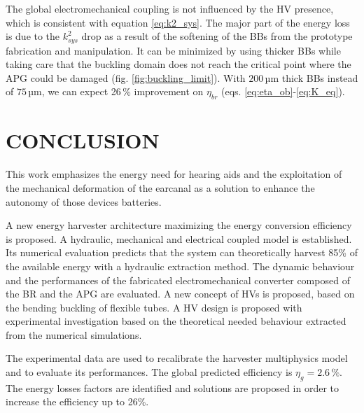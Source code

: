 \documentclass[3p,twocolumn,preprint]{elsarticle}
\begin{document}
The global electromechanical coupling is not influenced by the HV presence, which is consistent with equation \ref{eq:k2_sys}. The major part of the energy loss is due to the $k^2_{sys}$ drop as a result of the softening of the BBs from the prototype fabrication and manipulation. It can be minimized by using thicker BBs while taking care that the buckling domain does not reach the critical point where the APG could be damaged (fig. \ref{fig:buckling_limit}). With $200$\,µm thick BBs instead of $75$\,µm, we can expect 26\,\% improvement on $\eta_{br}$ (eqs. \ref{eq:eta_ob}-\ref{eq:K_eq}).
\section{CONCLUSION}
\label{sec:CONCLUSION}
This work emphasizes the energy need for hearing aids and the exploitation of the mechanical deformation of the earcanal as a solution to enhance the autonomy of those devices batteries.

A new energy harvester architecture maximizing the energy conversion efficiency is proposed. A hydraulic, mechanical and electrical coupled model is established. Its numerical evaluation predicts that the system can theoretically harvest 85\% of the available energy with a hydraulic extraction method. The dynamic behaviour and the performances of the fabricated electromechanical converter composed of the BR and the APG are evaluated. A new concept of HVs is proposed, based on the bending buckling of flexible tubes. A HV design is proposed with experimental investigation based on the theoretical needed behaviour extracted from the numerical simulations.

The experimental data are used to recalibrate the harvester multiphysics model and to evaluate its performances. The global predicted efficiency is $\eta_g=2.6\,\%$. The energy losses factors are identified and solutions are proposed in order to increase the efficiency up to 26\%.





% 
\end{document}
